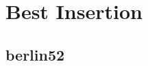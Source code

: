 \documentclass[
	final,
	a4paper,
	oneside,
	parskip=full,
	headings=standardclasses,
	headings=big,
	pointednumbers
]{scrartcl}
\begin{document}

    \begin{minipage}[t]{.5\linewidth}
        \section*{Best Insertion}

        \subsection*{berlin52}
    \end{minipage}
    \begin{minipage}[t]{.5\linewidth}
    \end{minipage}
\end{document}

